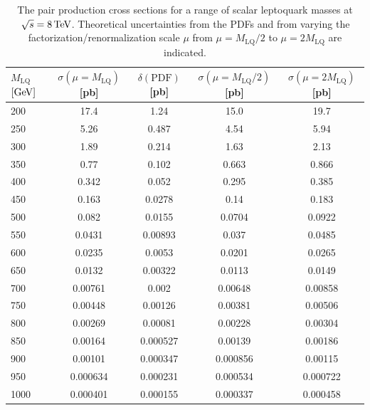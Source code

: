 \documentclass[12pt]{thesis}  %
\newcommand{\MLQ}{\ensuremath{M_{\text{LQ}}}\xspace}
\begin{document}
\begin{table}[htb]
\begin{center}
{\footnotesize
\begin{tabular}{|l||c|c||c|c|}
\hline
$\MLQ$ $[\text{Ge\hspace{-.08em}V}]$ & $\sigma (\mu = \MLQ)$ [pb] & $\delta (\text{PDF})$ [pb] & $\sigma (\mu = \MLQ/2)$ [pb] & $\sigma (\mu = 2\MLQ)$ [pb] \\
\hline
\hline
 200 & 17.4 & 1.24 & 15.0 & 19.7  \\
 250 & 5.26 & 0.487 & 4.54 & 5.94  \\
 300 & 1.89 & 0.214 & 1.63 & 2.13  \\
 350 & 0.77 & 0.102 & 0.663 & 0.866  \\
 400 & 0.342 & 0.052 & 0.295 & 0.385  \\
 450 & 0.163 & 0.0278 & 0.14 & 0.183  \\
 500 & 0.082 & 0.0155 & 0.0704 & 0.0922  \\
 550 & 0.0431 & 0.00893 & 0.037 & 0.0485  \\
 600 & 0.0235 & 0.0053 & 0.0201 & 0.0265  \\
 650 & 0.0132 & 0.00322 & 0.0113 & 0.0149  \\
 700 & 0.00761 & 0.002 & 0.00648 & 0.00858  \\
 750 & 0.00448 & 0.00126 & 0.00381 & 0.00506  \\
 800 & 0.00269 & 0.00081 & 0.00228 & 0.00304  \\
 850 & 0.00164 & 0.000527 & 0.00139 & 0.00186  \\
 900 & 0.00101 & 0.000347 & 0.000856 & 0.00115  \\
 950 & 0.000634 & 0.000231 & 0.000534 & 0.000722  \\
 1000 & 0.000401 & 0.000155 & 0.000337 & 0.000458  \\
\hline
\end{tabular}
}
\caption{The pair production cross sections for a range of scalar leptoquark masses at $\sqrt{s}=8\,\text{Te\hspace{-.08em}V}$. Theoretical uncertainties from the PDFs and from varying the factorization/renormalization scale $\mu$ from $\mu=\MLQ/2$ to $\mu=2\MLQ$ are indicated.}
\label{tab:lq-xsec}
\end{center}
\end{table}
\end{document}
